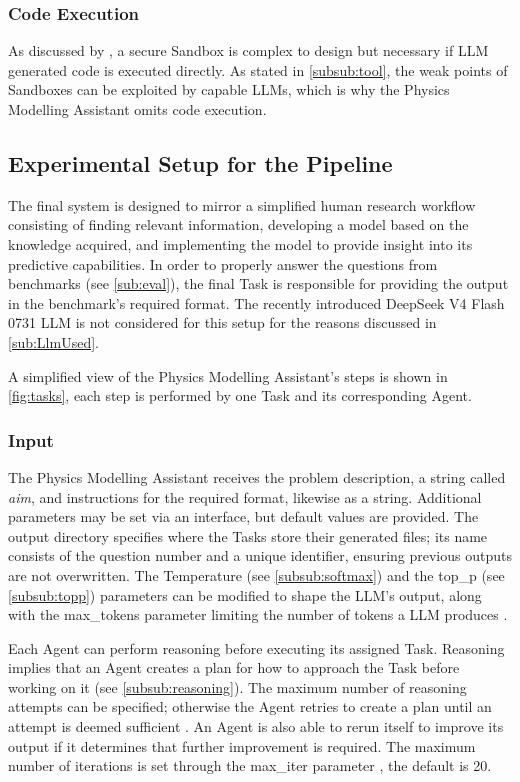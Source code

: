 \documentclass[
	fontsize = 11pt,
	paper = a4,
	draft = false,
	twoside = true,
	titlepage = false
]{scrartcl}
\numberwithin{equation}{subsection}
\begin{document}
	\subsubsection{Code Execution}
	As discussed by \citeauthor{sandboxEscape} \autocite{sandboxEscape}, a secure Sandbox is complex to design but necessary if \gls{LLM} generated code is executed directly. As stated in \autoref{subsub:tool}, the weak points of Sandboxes can be exploited by capable \gls{LLM}s, which is why the Physics Modelling Assistant omits code execution.
	
	\subsection{Experimental Setup for the Pipeline} \label{sub:expSetup}
	The final system is designed to mirror a simplified human research workflow consisting of finding relevant information, developing a model based on the knowledge acquired, and implementing the model to provide insight into its predictive capabilities. In order to properly answer the questions from benchmarks (see \autoref{sub:eval}), the final Task is responsible for providing the output in the benchmark's required format. The recently introduced DeepSeek V4 Flash 0731 \gls{LLM} is not considered for this setup for the reasons discussed in \autoref{sub:LlmUsed}.
	
	A simplified view of the Physics Modelling Assistant's steps is shown in \autoref{fig:tasks}, each step is performed by one Task and its corresponding \gls{Agent}.
	
	\subsubsection{Input} \label{subsub:input}
	The Physics Modelling Assistant receives the problem description, a string called \textit{aim}, and instructions for the required format, likewise as a string. Additional parameters may be set via an interface, but default values are provided. The output directory specifies where the Tasks store their generated files; its name consists of the question number and a unique identifier, ensuring previous outputs are not overwritten. The Temperature (see \autoref{subsub:softmax}) and the top\_p (see \autoref{subsub:topp}) parameters can be modified to shape the \gls{LLM}'s output, along with the max\_tokens parameter limiting the number of \glspl{token} a \gls{LLM} produces \autocite{saiaModels}.
	
	Each \gls{Agent} can perform reasoning before executing its assigned Task. Reasoning implies that an \gls{Agent} creates a plan for how to approach the Task before working on it \autocite{crewaiAgentDoc} (see \autoref{subsub:reasoning}). The maximum number of reasoning attempts can be specified; otherwise the \gls{Agent} retries to create a plan until an attempt is deemed sufficient \autocite{crewaiAgentDoc}. An \gls{Agent} is also able to rerun itself to improve its output if it determines that further improvement is required. The maximum number of iterations is set through the max\_iter parameter \autocite{crewaiAgentDoc}, the default is 20.
	
\end{document}

